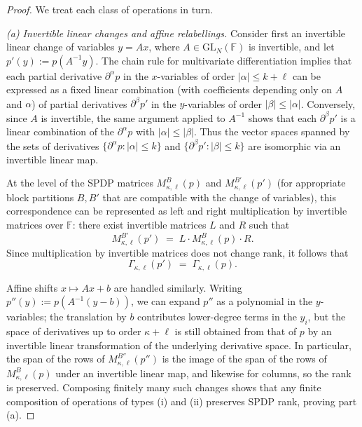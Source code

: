 \documentclass[12pt]{article}
\theoremstyle{definition}
\theoremstyle{definition}
\theoremstyle{remark}
\theoremstyle{remark}
\begin{document}
\begin{proof}
We treat each class of operations in turn.

\medskip\noindent
\emph{(a) Invertible linear changes and affine relabellings.}
Consider first an invertible linear change of variables
$y = A x$, where $A\in \mathrm{GL}_N(\mathbb{F})$ is invertible, and let
$p'(y) := p(A^{-1}y)$. The chain rule for multivariate differentiation
implies that each partial derivative $\partial^\alpha p$ in the $x$-variables
of order $|\alpha|\le k+\ell$ can be expressed as a fixed linear
combination (with coefficients depending only on $A$ and $\alpha$) of
partial derivatives $\partial^\beta p'$ in the $y$-variables of order
$|\beta|\le |\alpha|$. Conversely, since $A$ is invertible, the same
argument applied to $A^{-1}$ shows that each $\partial^\beta p'$ is a
linear combination of the $\partial^\alpha p$ with $|\alpha|\le |\beta|$.
Thus the vector spaces spanned by the sets of derivatives
$\{\partial^\alpha p : |\alpha|\le k\}$ and
$\{\partial^\beta p' : |\beta|\le k\}$ are isomorphic via an invertible
linear map.

At the level of the SPDP matrices $M^{B}_{\kappa,\ell}(p)$ and
$M^{B'}_{\kappa,\ell}(p')$ (for appropriate block partitions $B,B'$ that are
compatible with the change of variables), this correspondence can be
represented as left and right multiplication by invertible matrices over
$\mathbb{F}$: there exist invertible matrices $L$ and $R$ such that
\[
   M^{B'}_{\kappa,\ell}(p') \;=\; L \cdot M^{B}_{\kappa,\ell}(p)\cdot R.
\]
Since multiplication by invertible matrices does not change rank, it
follows that
\[
   \Gamma_{\kappa,\ell}(p') \;=\; \Gamma_{\kappa,\ell}(p).
\]

Affine shifts $x \mapsto A x + b$ are handled similarly. Writing
$p''(y) := p(A^{-1}(y-b))$, we can expand $p''$ as a polynomial in the
$y$-variables; the translation by $b$ contributes lower-degree terms in
the $y_i$, but the space of derivatives up to order $\kappa+\ell$ is still
obtained from that of $p$ by an invertible linear transformation of the
underlying derivative space. In particular, the span of the rows of
$M^{B''}_{\kappa,\ell}(p'')$ is the image of the span of the rows of
$M^{B}_{\kappa,\ell}(p)$ under an invertible linear map, and likewise for
columns, so the rank is preserved. Composing finitely many such changes
shows that any finite composition of operations of types (i) and (ii)
preserves SPDP rank, proving part (a).


\end{proof}
\end{document}
